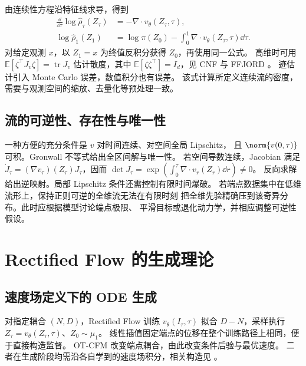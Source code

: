 由连续性方程沿特征线求导，得到
\begin{equation}
 \begin{aligned}
 \frac{\dd}{\dd\tau}\log\widehat\rho_\tau(Z_\tau)
 &=-\nabla\cdot v_\theta(Z_\tau,\tau),\\
 \log\widehat\rho_1(Z_1)&=\log\pi(Z_0)-
                  \int_0^1\nabla\cdot v_\theta(Z_\tau,\tau)\dd\tau.
 \end{aligned}
 \label{eq:generation-cnf-density}
\end{equation}
对给定观测 \(x\)，以 \(Z_1=x\) 为终值反积分获得 \(Z_0\)，再使用同一公式。
高维时可用 \(\mathbb E[\zeta^\top J_v\zeta]=\operatorname{tr}J_v\)
估计散度，其中 \(\mathbb E[\zeta\zeta^\top]=I_d\)，见 CNF 与 FFJORD
\cite{chen2018neuralode,grathwohl2019ffjord}。
迹估计引入 Monte Carlo 误差，数值积分也有误差。
该式计算所定义连续流的密度，需要与观测空间的缩放、去量化等预处理一致。

\subsection{流的可逆性、存在性与唯一性}

一种方便的充分条件是 \(v\) 对时间连续、对空间全局 Lipschitz，
且 \(\norm{v(0,\tau)}\) 可积。Gronwall 不等式给出全区间解与唯一性。
若空间导数连续，Jacobian 满足
\(\dot J_\tau=(\nabla v_\tau)(Z_\tau)J_\tau\)，因而
\(\det J_\tau=\exp(\int_0^\tau\nabla\cdot v_r(Z_r)\dd r)\ne0\)。
反向求解给出逆映射。局部 Lipschitz 条件还需控制有限时间爆破。
若端点数据集中在低维流形上，保持正则可逆的全维流无法在有限时刻
把全维先验精确压到该奇异分布。此时应根据模型讨论端点极限、
平滑目标或退化动力学，并相应调整可逆性假设。

\section{Rectified Flow 的生成理论}
\label{sec:generation-rf}

\subsection{速度场定义下的 ODE 生成}

对指定耦合 \((N,D)\)，Rectified Flow 训练
\(v_\theta(I_\tau,\tau)\) 拟合 \(D-N\)，采样执行
\(\dot Z_\tau=v_\theta(Z_\tau,\tau)\)、\(Z_0\sim\mu_1\)。
线性插值固定端点的位移在整个训练路径上相同，便于直接构造监督。
OT-CFM 改变端点耦合，由此改变条件后验与最优速度。
二者在生成阶段均需沿各自学到的速度场积分，相关构造见
\cite{liu2023rectified,tong2024otcfm}。

